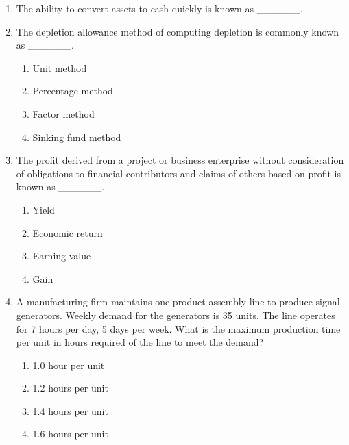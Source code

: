 \documentclass[11pt,a4paper]{article}
\begin{document}
\begin{enumerate}
\item{The ability to convert assets to cash quickly is known as \_\_\_\_\_\_.}
\\
\item{The depletion allowance method of computing depletion is commonly known as \_\_\_\_\_\_.}
\begin{enumerate}[label=\Alph*.]
\item{Unit method}
\item{Percentage method}
\item{Factor method}
\item{Sinking fund method}
\end{enumerate}
\item{The profit derived from a project or business enterprise without consideration of obligations to financial contributors and claims of others based on profit is known as \_\_\_\_\_\_.}
\begin{enumerate}[label=\Alph*.]
\item{Yield}
\item{Economic return}
\item{Earning value}
\item{Gain}
\end{enumerate}
\item{A manufacturing firm maintains one product assembly line to produce signal generators. Weekly demand for the generators is 35 units. The line operates for 7 hours per day, 5 days per week. What is the maximum production time per unit in hours required of the line to meet the demand?}
\begin{enumerate}[label=\Alph*.]
\item{1.0 hour per unit}
\item{1.2 hours per unit}
\item{1.4 hours per unit}
\item{1.6 hours per unit}
\end{enumerate}

\end{enumerate}
\end{document}
